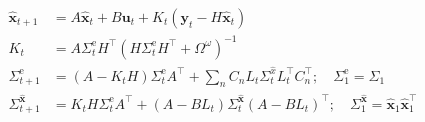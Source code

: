 $$
\begin{aligned}
\hat{\mathbf{x}}_{t+1} &=A \hat{\mathbf{x}}_{t}+B \mathbf{u}_{t}+K_{t}\left(\mathbf{y}_{t}-H \hat{\mathbf{x}}_{t}\right) \\
K_{t} &=A \Sigma_{t}^{\mathrm{e}} H^\top\left(H \Sigma_{t}^{\mathrm{e}} H^\top+\Omega^{\omega}\right)^{-1} \\
\Sigma_{t+1}^{\mathrm{e}} &=\left(A-K_{t} H\right) \Sigma_{t}^{\mathrm{e}} A^\top+\sum_{n} C_{n} L_{t} \Sigma_{t}^{\hat{x}} L_{t}^\top C_{n}^\top ; \quad \Sigma_{1}^{\mathrm{e}}=\Sigma_{1} \\
\Sigma_{t+1}^{\hat{\mathbf{x}}} &=K_{t} H \Sigma_{t}^{\mathrm{e}} A^\top+\left(A-B L_{t}\right) \Sigma_{t}^{\hat{\mathbf{x}}}\left(A-B L_{t}\right)^\top ; \quad \Sigma_{1}^{\hat{\mathbf{x}}}=\hat{\mathbf{x}}_{1} \hat{\mathbf{x}}_{1}^\top
\end{aligned}
$$